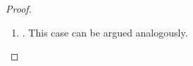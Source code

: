 \begin{proof}
\begin{description}
\begin{itemize}
\begin{enumerate}
						\item {}.
							This case can be argued analogously.
			\qedhere
					\end{enumerate}


			\end{itemize}

			\begin{comment} %
		\item[\normalfont Equality rules.]
			Suppose the property holds for $n$ rule applications and the $(n+1)$th rule is an equality rule.
			We consider an example:

			\begin{itemize}
				\item The last rule application was an instance of $\lkrule{=}{r_1}$. Then it is of the form:
					\begin{prooftree}
						\Axiomm{\Gamma\fCenter \Delta, A\subst{T/t} }
						\Axiomm{\Sigma \fCenter \Pi, s=t}
						\RightLabelm{\lkrule{=}{r_1}}
						\BinaryInfm{\Gamma, \Sigma\fCenter \Delta, \Pi, A\subst{T/s}  }
					\end{prooftree}

					There are two possible partitions of $\Gamma, \Sigma \vdash \Delta, \Pi A\subst{T/s} $:
					\begin{enumerate}
						\item $\partisym = \parti{\Gamma_1, \Sigma_1}{\Delta_1, \Pi_1, A\subst{T/s}}{\Gamma_2, \Sigma_2}{\Delta_2, \Pi_2}$.  

					By the induction hypothesis, there is an interpolant $I_1$ for the partition $\parti{\Gamma_1}{\Delta_1, A\subst{T/t}}{\Gamma_2}{\Delta_2}$ of the left upper sequent.
					Hence $\Gamma_1 \fCenter \Delta_1, A\subst{T/t}, I_1$ and $I_1, \Gamma_2 \fCenter \Delta_2$.

					We also get by the induction hypothesis that there is an interpolant $I_2$ for the partition $\parti{\Sigma_1}{\Pi_1, s=t}{\Sigma_2}{\Pi_2}$ of the right upper sequent. Here, we have that 
					$\Sigma_1 \fCenter \Pi_1, s=t, I_2$ and $I_2, \Sigma_2 \fCenter \Pi_2$.

					Now we establish that $I_1 \lor I_2$ is an interpolant for $\partisym$.

					\begin{prooftree}
						\Axiomm{\Gamma_1 \fCenter \Delta_1, A\subst{T/t}, I_1}
						\Axiomm{\Sigma_1 \fCenter \Pi_1, s=t, I_2}
						\RightLabelm{\lkrule{=}{r_2}}
						\BinaryInfm{\Gamma_1, \Sigma_1 \fCenter \Delta_1, \Pi_1, A\subst{T/s}, I_1, I_2}
						\RightLabelm{\lkrule{\lor}{r}}
						\UnaryInfm{\Gamma_1, \Sigma_1 \fCenter \Delta_1, \Pi_1, A\subst{T/s}, I_1 \lor I_2}
					\end{prooftree}


\end{comment}
\end{description}
\end{proof}
